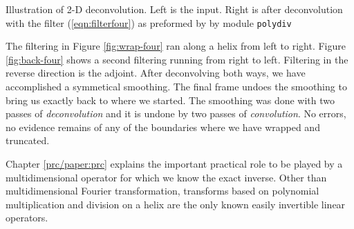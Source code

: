  { 
  Illustration of 2-D deconvolution.
  Left is the input.
  Right is after deconvolution with
  the filter (\protect\ref{eqn:filterfour})
  as preformed by
  by module
  \texttt{polydiv} %
}

The filtering in Figure \ref{fig:wrap-four}
ran along a helix from left to right.
Figure \ref{fig:back-four}
shows a second filtering running from right to left.
Filtering in the reverse direction is the adjoint.
After deconvolving both ways, we have accomplished a symmetical smoothing.
The final frame undoes the smoothing to bring us exactly back
to where we started.
The smoothing was done with two passes of {\it deconvolution}
and it is undone by two passes of {\it convolution}.
No errors, no evidence remains of any of the boundaries
where we have wrapped and truncated.


\par
Chapter \ref{prc/paper:prc} explains the important practical role
to be played by a multidimensional operator for which
we know the exact inverse.  
Other than multidimensional Fourier transformation,
transforms based on polynomial multiplication and division
on a helix are the only known easily invertible linear operators.


